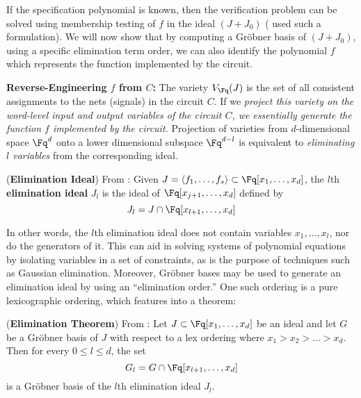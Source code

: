 If the specification polynomial is known, then the verification
problem can be solved using membership testing of $f$ in the ideal $(J
+ J_0)$ (\cite{lv:date2012} used such a formulation). We will now show
that by computing a Gr\"obner basis of $(J + J_0)$, using a specific
elimination term order, we can also identify the polynomial $f$ which
represents the function implemented by the circuit.


{\bf Reverse-Engineering $f$ from $C$:} The variety $V_{\Fq}(J)$ is
the set of all consistent assignments to the nets (signals) in the
circuit $C$. If we {\it project this variety on the word-level input and
output variables of the circuit $C$, we essentially generate the
function $f$ implemented by the circuit.} Projection of varieties from
$d$-dimensional space $\Fq^d$ onto a lower dimensional subspace
$\Fq^{d-l}$ is equivalent to {\it eliminating $l$ variables} from the
corresponding ideal. 

\begin{Definition}
    ({\bf Elimination Ideal}) From \cite{ideals:book}:  Given
  $J=\langle f_1,\dots,f_s\rangle \subset \Fq[x_1,\dots,x_d]$, the
  $l$th {\bf elimination ideal} $J_l$ is the ideal of
  $\Fq[x_{j+1},\dots,x_d]$ defined by 
    \begin{equation}
        J_l= J \cap \Fq[x_{l+1},\dots,x_d]
    \end{equation}
\end{Definition}

In other words, the $l$th elimination ideal does not contain variables
$x_1,\dots,x_l$, nor do the generators of it.  This can aid in solving
systems of polynomial equations by isolating variables in a set of
constraints, as is the purpose of techniques such as Gaussian
elimination. 
Moreover, Gr\"obner bases may be used to generate an elimination ideal
by using an ``elimination order.''  One such ordering
is a pure lexicographic ordering, which features into a theorem:
\begin{Theorem} \label{thm:elim}
({\bf Elimination Theorem}) From \cite{ideals:book}: Let $J
  \subset \Fq[x_1,\dots,x_d]$ be an     ideal and let $G$ be a
  Gr\"obner basis of $J$ with respect to a lex ordering where $x_1
  > x_2 > \dots > x_d$.  Then for every $0     \leq l \leq
  d$, the set 
    \begin{equation}
        G_l= G \cap \Fq[x_{l+1},\dots,x_d]
    \end{equation}
    is a Gr\"obner basis of the $l$th elimination ideal $J_l$.
\end{Theorem}

